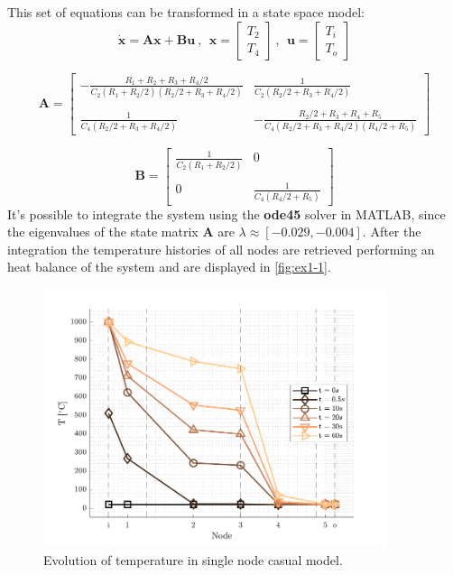 \documentclass[11pt,a4paper,oneside]{article}
\renewcommand{\vec}[1]{\mathbf{#1}}
\begin{document}
This set of equations can be transformed in a state space model:
\begin{equation}
    \vec{\dot x}=\vec{A}\vec{x}+\vec{B}\vec{u} \ , \ \ \vec{x}=\begin{bmatrix} T_2 \\ T_4 \end{bmatrix} \ , \ \ \vec{u}=\begin{bmatrix} T_i \\ T_o \end{bmatrix}
\end{equation}

\begin{equation}
    \vec{A} = 
    \begin{bmatrix}
        -\frac{R_1+R_2+R_3+R_4/2}{C_2(R_1+R_2/2)(R_2/2+R_3+R_4/2)} & \frac{1}{C_2(R_2/2+R_3+R_4/2)}\\
        \\
        \frac{1}{C_4(R_2/2+R_3+R_4/2)} & -\frac{R_2/2+R_3+R_4+R_5}{C_4(R_2/2+R_3+R_4/2)(R_4/2+R_5)}
    \end{bmatrix}
\end{equation}

\begin{equation}
    \vec{B} = 
    \begin{bmatrix}
        \frac{1}{C_2(R_1+R_2/2)} & 0\\
        \\
        0 & \frac{1}{C_4(R_4/2+R_5)}
    \end{bmatrix}
\end{equation}
It's possible to integrate the system using the \textbf{ode45} solver in MATLAB, since the eigenvalues of the state 
matrix $\vec{A}$ are $\lambda \approx [-0.029,-0.004]$. After the integration the temperature histories
of all nodes are retrieved performing an heat balance of the system and are displayed in \autoref{fig:ex1-1}.

\begin{figure}[h]
    \centering
        \includegraphics[width = 0.9\textwidth]{gfx/ex1-1.pdf}
        \caption{Evolution of temperature in single node casual model.}\label{fig:ex1-1}
\end{figure}
\end{document}
